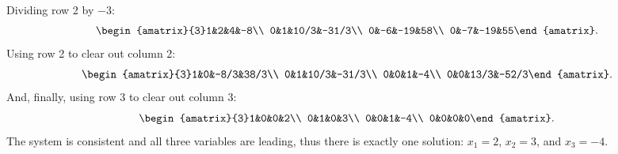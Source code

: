 \begin{SaveQuestion}
Dividing row 2 by $-3$:
\[\begin{amatrix}{3}1&2&4&-8\\ 0&1&10/3&-31/3\\ 0&-6&-19&58\\ 0&-7&-19&55\end{amatrix}.\]
Using row 2 to clear out column 2:
\[\begin{amatrix}{3}1&0&-8/3&38/3\\ 0&1&10/3&-31/3\\ 0&0&1&-4\\ 0&0&13/3&-52/3\end{amatrix}.\]
And, finally, using row 3 to clear out column 3:
\[\begin{amatrix}{3}1&0&0&2\\ 0&1&0&3\\ 0&0&1&-4\\ 0&0&0&0\end{amatrix}.\]
The system is consistent and all three variables are leading, thus there is exactly one solution: $x_1=2$, $x_2=3$, and $x_3=-4$.
\end{SaveQuestion}


